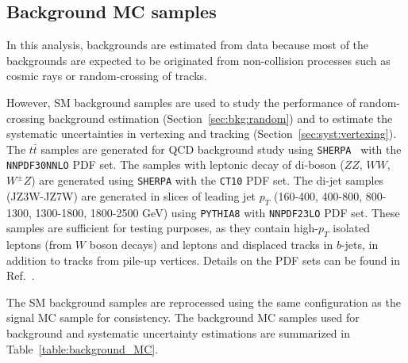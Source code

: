 \subsection{Background MC samples}
\label{sec:background_mc_sample}
In this analysis, backgrounds are estimated from data because most of the backgrounds are expected to be originated from non-collision processes such as cosmic rays or random-crossing of tracks. %

However, SM background samples are used to study the performance of random-crossing background estimation (Section~\ref{sec:bkg:random}) and to estimate the systematic uncertainties in vertexing and tracking (Section~\ref{sec:syst:vertexing}). The $t\bar{t}$ samples are generated for QCD background study using \texttt{SHERPA}~\cite{Gleisberg:2008ta} with the \texttt{NNPDF30NNLO} PDF set. The samples with leptonic decay of di-boson ($ZZ$, $WW$, $W^{\pm}Z$) are generated using \texttt{SHERPA} with the \texttt{CT10} PDF set. The di-jet samples (JZ3W-JZ7W) are generated in slices of leading jet $p_{T}$ (160-400, 400-800, 800-1300, 1300-1800, 1800-2500 GeV) using \texttt{PYTHIA8} with \texttt{NNPDF23LO} PDF set. These samples are sufficient for testing purposes, as they contain high-$p_{T}$ isolated leptons (from $W$ boson decays) and leptons and displaced tracks in $b$-jets, in addition to tracks from pile-up vertices. Details on the PDF sets can be found in Ref.~\cite{Ball:2014uwa}.

The SM background samples are reprocessed using the same configuration as the signal MC sample for consistency. The background MC samples used for background and systematic uncertainty estimations are summarized in Table~\ref{table:background_MC}.


